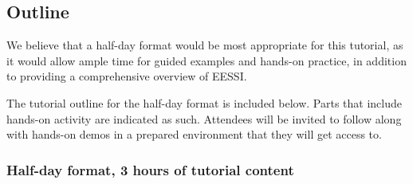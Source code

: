 \subsection*{Outline}

We believe that a half-day format would be most appropriate for this tutorial, as it would allow ample time for guided
examples and hands-on practice, in addition to providing a comprehensive overview of EESSI.

The tutorial outline for the half-day format is included below.
Parts that include hands-on activity are indicated as such.
Attendees will be invited to follow along with hands-on demos in a prepared environment that they will get access to.

\subsubsection*{Half-day format, 3 hours of tutorial content}


